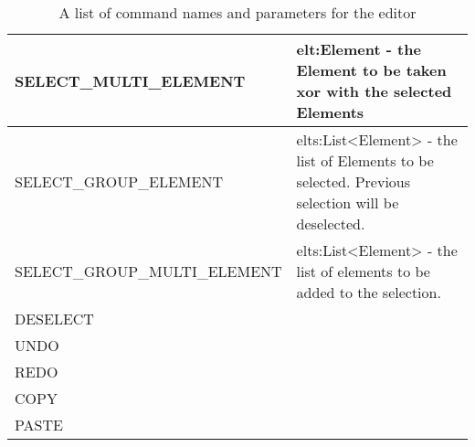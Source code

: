 \begin{table}
\begin{tabular}{p{6cm} | p{8cm}}
 \hline
  SELECT_MULTI_ELEMENT & elt:Element - the Element to be taken xor with the selected Elements \\
 \hline
  SELECT_GROUP_ELEMENT & elts:List<Element> - the list of Elements to be selected.  Previous selection will be deselected. \\
 \hline
  SELECT_GROUP_MULTI_ELEMENT & elts:List<Element> - the list of elements to be added to the selection. \\
 \hline
  DESELECT & \\
 \hline
  UNDO & \\
 \hline
  REDO & \\
 \hline
  COPY & \\
 \hline
  PASTE & \\

 \end{tabular}
\caption{A list of command names and parameters for the editor} \label{tab:table1}
\end{table}

